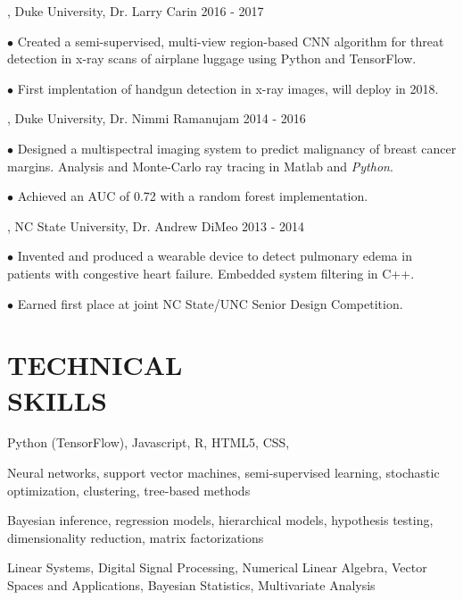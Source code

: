 \documentclass[resmargin, 11pt]{resume_style_class} %
\newenvironment{outline}
  {\begin{list}{}{\setlength{\leftmargin}{30pt}\setlength\itemsep{-2pt}}}
  {\end{list}}
\newenvironment{outline-cond}
  {\begin{list}{}{
  \setlength{\leftmargin}{30pt}
  \setlength\topsep{-10pt}
  \setlength\itemindent{-30pt}
  }}
  {\end{list}}
\begin{document}
\begin{resume}
, Duke University, Dr. Larry Carin \hfill 2016 - 2017
\begin{outline}
\item[$\bullet$\hspace{0.1cm}] Created a semi-supervised, multi-view region-based CNN algorithm for threat detection in x-ray scans of airplane luggage using Python and TensorFlow.
\item[$\bullet$\hspace{0.1cm}] First implentation of handgun detection in x-ray images, will deploy in 2018.
\end{outline}

, Duke University, Dr. Nimmi Ramanujam \hfill 2014 - 2016
\begin{outline}
\item[$\bullet$\hspace{0.1cm}] Designed a multispectral imaging system to predict malignancy of breast cancer margins. Analysis and Monte-Carlo ray tracing in Matlab and \textit{Python}.
\item[$\bullet$\hspace{0.1cm}]  Achieved an AUC of 0.72 with a random forest implementation.
\end{outline}

, NC State University, Dr. Andrew DiMeo \hfill 2013 - 2014
\begin{outline}
\item[$\bullet$\hspace{0.1cm}]  Invented and produced a wearable device to detect pulmonary edema in patients with congestive heart failure. Embedded system filtering in C++.
\item[$\bullet$\hspace{0.1cm}]  Earned first place at joint NC State/UNC Senior Design Competition.
\end{outline}


\section{TECHNICAL \\ SKILLS}
\begin{outline-cond} 
\item {}  Python (TensorFlow), Javascript, R, HTML5, CSS,
\item {}
Neural networks, support vector machines, semi-supervised learning, stochastic optimization, clustering, tree-based methods
\item {}
Bayesian inference, regression models, hierarchical models, hypothesis testing, dimensionality reduction, matrix factorizations
\item {} 
 Linear Systems, Digital Signal Processing, Numerical Linear Algebra, Vector Spaces and Applications, Bayesian Statistics, Multivariate Analysis
\end{outline-cond}


\end{resume}
\end{document}
